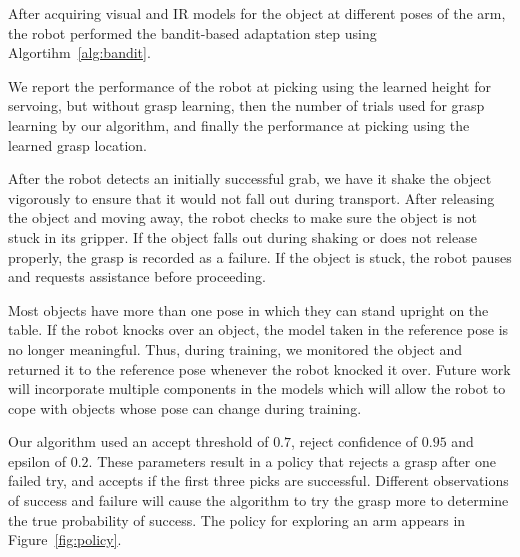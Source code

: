 \documentclass{article}
\begin{document}
After acquiring visual and IR models for the object at different poses
of the arm, the robot performed the bandit-based adaptation step using
Algortihm~\ref{alg:bandit}.

We report the performance of the robot at picking using the learned
height for servoing, but without grasp learning, then the number of
trials used for grasp learning by our algorithm, and finally the
performance at picking using the learned grasp location.

After the robot detects an initially successful grab, we have it
shake the object vigorously to ensure that it would not fall out during
transport. After releasing the object and moving away, the robot checks 
to make sure the object is not stuck in its gripper. If the object
falls out during shaking or does not release properly, the grasp is
recorded as a failure. If the object is stuck, the robot pauses and
requests assistance before proceeding.

Most objects have more than one pose in which they can stand upright on
the table. If the robot knocks over an object, the model taken in the 
reference pose is no longer meaningful. Thus, during training,
we monitored the object and returned it to the reference pose whenever the 
robot knocked it over. Future work will incorporate multiple components in
the models which will allow the robot to cope with objects whose pose
can change during training. 

Our algorithm used an accept threshold of $0.7$, reject confidence of
$0.95$ and epsilon of $0.2$.  These parameters result in a policy that
rejects a grasp after one failed try, and accepts if the first three
picks are successful.  Different observations of success and failure
will cause the algorithm to try the grasp more to determine the true
probability of success.  The policy for exploring an arm appears in
Figure~\ref{fig:policy}.
\end{document}
